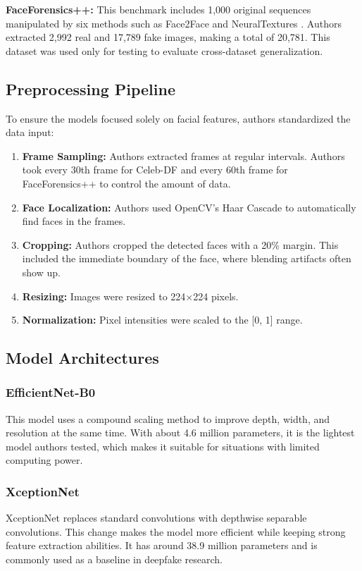 \documentclass[runningheads]{llncs}
\begin{document}
\textbf{FaceForensics++:} This benchmark includes 1,000 original sequences manipulated by six methods such as Face2Face and NeuralTextures \cite{faceforensics}. Authors extracted 2,992 real and 17,789 fake images, making a total of 20,781. This dataset was used only for testing to evaluate cross-dataset generalization.

\subsection{Preprocessing Pipeline}
To ensure the models focused solely on facial features, authors standardized the data input:

\begin{enumerate}
    \item \textbf{Frame Sampling:} Authors extracted frames at regular intervals. Authors took every 30th frame for Celeb-DF and every 60th frame for FaceForensics++ to control the amount of data.

    \item \textbf{Face Localization:} Authors used OpenCV's Haar Cascade to automatically find faces in the frames.

    \item \textbf{Cropping:} Authors cropped the detected faces with a 20\% margin. This included the immediate boundary of the face, where blending artifacts often show up.

    \item \textbf{Resizing:} Images were resized to 224$\times$224 pixels.

    \item \textbf{Normalization:} Pixel intensities were scaled to the [0, 1] range.
\end{enumerate}

\subsection{Model Architectures}

\subsubsection{EfficientNet-B0}
This model uses a compound scaling method to improve depth, width, and resolution at the same time. With about 4.6 million parameters, it is the lightest model authors tested, which makes it suitable for situations with limited computing power.

\subsubsection{XceptionNet}
XceptionNet replaces standard convolutions with depthwise separable convolutions. This change makes the model more efficient while keeping strong feature extraction abilities. It has around 38.9 million parameters and is commonly used as a baseline in deepfake research.
\end{document}
